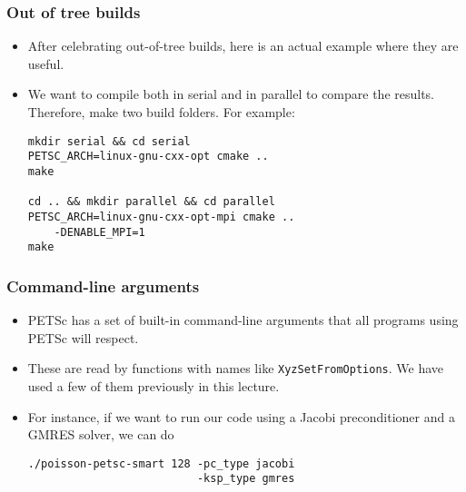 \begin{frame}[fragile]
  \frametitle{Out of tree builds}
  \begin{itemize}
  \item After celebrating out-of-tree builds, here is an actual example where
    they are useful.
  \item We want to compile both in serial and in parallel to compare the
    results. Therefore, make two build folders. For example:
    \begin{lstlisting}
mkdir serial && cd serial
PETSC_ARCH=linux-gnu-cxx-opt cmake ..
make

cd .. && mkdir parallel && cd parallel
PETSC_ARCH=linux-gnu-cxx-opt-mpi cmake ..
    -DENABLE_MPI=1
make
    \end{lstlisting}
  \end{itemize}
\end{frame}

\begin{frame}[fragile]
  \frametitle{Command-line arguments}
  \begin{itemize}
  \item PETSc has a set of built-in command-line arguments that all programs
    using PETSc will respect.
  \item These are read by functions with names like \texttt{XyzSetFromOptions}.
    We have used a few of them previously in this lecture.
  \item For instance, if we want to run our code using a Jacobi preconditioner
    and a GMRES solver, we can do
    \begin{lstlisting}
./poisson-petsc-smart 128 -pc_type jacobi
                          -ksp_type gmres
    \end{lstlisting}
  \end{itemize}
\end{frame}


